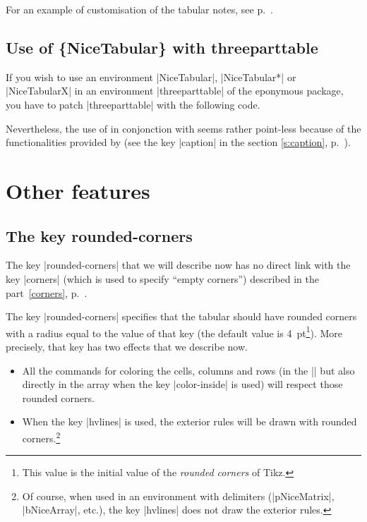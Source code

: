\documentclass[dvipsnames]{article}%
\begin{document}

\bigskip
For an example of customisation of the tabular notes, see p.~\pageref{ex:notes}.


\subsection{Use of \{NiceTabular\} with threeparttable}


If you wish to use an environment |{NiceTabular}|, |{NiceTabular*}| or
|{NiceTabularX}| in an environment |{threeparttable}| of the eponymous package,
you have to patch |{threeparttable}| with the following code.

\begin{Code}
\makeatletter
{}
  {}
\makeatother
\end{Code}

Nevertheless, the use of  in conjonction with
 seems rather point-less because of the functionalities
provided by  (see the key |caption| in the section
\ref{s:caption}, p.~\pageref{s:caption}).


\section{Other features}

\subsection{The key rounded-corners}

\label{tabular-rounded-corners}

The key |rounded-corners| that we will describe now has no direct link with
the key |corners| (which is used to specify ``empty corners'') described in
the part~\ref{corners}, p.~\pageref{corners}.

\smallskip
The key |rounded-corners| specifies that the tabular should have rounded corners
with a radius equal to the value of that key (the default value is
4~pt\footnote{This value is the initial value of the \emph{rounded corners} of
  Tikz.}). More precisely, that key has two effects that we describe now.
\begin{itemize}
\item All the commands for coloring the cells, columns and rows (in the
|\CodeBefore| but also directly in the array when the key |color-inside| is
used) will respect those rounded corners.

\item When the key |hvlines| is used, the exterior rules will be drawn with
rounded corners.\footnote{Of course, when used in an environment with delimiters
(|{pNiceMatrix}|, |{bNiceArray}|, etc.), the key |hvlines| does not draw the
exterior rules.}
\end{itemize}
\end{document}
